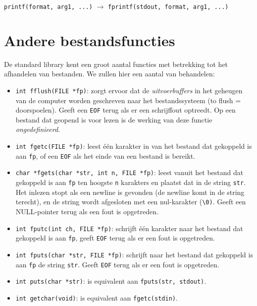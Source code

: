 \hspace*{1em}\texttt{printf(format, arg1, ...)} \quad $\longrightarrow$ \quad \texttt{fprintf(stdout, format, arg1, ...)}


\section{Andere bestandsfuncties}
\label{sec:anderebestandsfuncties}
De standard library kent een groot aantal functies met betrekking tot het afhandelen van bestanden. We zullen hier een aantal van behandelen:

\begin{itemize}[]
\item \texttt{int fflush(FILE *fp)}: zorgt ervoor dat de \textsl{uitvoerbuffers} in het geheugen van de computer worden geschreven naar het bestandssysteem (to flush = doorspoelen). Geeft een \texttt{EOF} terug als er een schrijffout optreedt. Op een bestand dat geopend is voor lezen is de werking van deze functie \textsl{ongedefinieerd}.
\item \texttt{int fgetc(FILE *fp)}: leest één karakter in van het bestand dat gekoppeld is aan \texttt{fp}, of een \texttt{EOF} als het einde van een bestand is bereikt.
\item \texttt{char *fgets(char *str, int n, FILE *fp)}: leest vanuit het bestand dat gekoppeld is aan \texttt{fp} ten hoogste \texttt{n} karakters en plaatst dat in de string \texttt{str}. Het inlezen stopt als een newline is gevonden (de newline komt in de string terecht), en de string wordt afgesloten met een nul-karakter (\texttt{\textquotesingle\textbackslash0\textquotesingle)}. Geeft een NULL-pointer terug als een fout is opgetreden.
\item \texttt{int fputc(int ch, FILE *fp)}: schrijft één karakter naar het bestand dat gekoppeld is aan \texttt{fp}, geeft \texttt{EOF} terug als er een fout is opgetreden.
\item \texttt{int fputs(char *str, FILE *fp)}: schrijft naar het bestand dat gekoppeld is aan \texttt{fp} de string \texttt{str}. Geeft \texttt{EOF} terug als er een fout is opgetreden.
\item \texttt{int puts(char *str)}: is equivalent aan \texttt{fputs(str, stdout)}.
\item \texttt{int getchar(void)}: is equivalent aan \texttt{fgetc(stdin)}.

\end{itemize}
